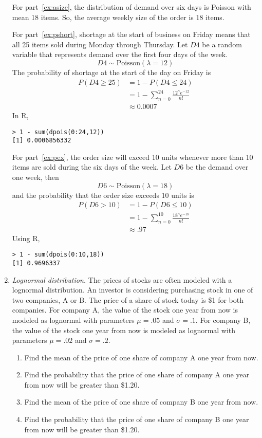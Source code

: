 \begin{enumerate}
\begin{solution}
\bs
For part~\ref{ex:asize}, the distribution of demand over six days is
Poisson with mean 18 items. So, the average weekly size
of the order is 18 items.

For part~\ref{ex:pshort}, shortage at the start of business on Friday means
that all 25 items sold during Monday through Thursday. Let
$D4$ be a random variable that represents demand over the
first four days of the week.
\[ D4 \sim \text{Poisson}(\lambda = 12) \]
The probability of shortage at the start of the day on Friday is
\begin{align*}
  P(D4 \geq 25) &= 1 - P(D4 \leq 24)\\
                &= 1 - \sum_{n=0}^{24} \frac{12^n e^{-12}}{n!}\\
                &\approx 0.0007
\end{align*}
In R,
\begin{Verbatim}
> 1 - sum(dpois(0:24,12))
[1] 0.0006856332
\end{Verbatim}

For part~\ref{ex:pex}, the order size will exceed 10 units whenever more than
10 items are sold during the six days of the week. Let $D6$ be
the demand over one week, then
\[ D6 \sim \text{Poisson}(\lambda = 18) \]
and the probability that the order size exceeds 10 units is
\begin{align*}
  P(D6 > 10) &= 1 - P(D6 \leq 10) \\
             &= 1 - \sum_{n=0}^{10} \frac{18^n e^{-18}}{n!}\\
             &\approx .97
\end{align*}
Using R,
\begin{Verbatim}
> 1 - sum(dpois(0:10,18))
[1] 0.9696337
\end{Verbatim}
\end{solution}

\item \emph{Lognormal distribution.} The prices of stocks are often modeled
  with a lognormal distribution. An investor is considering purchasing
  stock in one of two companies, A or B. The price of a share of stock
  today is \$1 for both companies. For company A, the value of the
  stock one year from now is modeled as lognormal with parameters
  $\mu=.05$ and $\sigma=.1$. For company B, the value of the stock one
  year from now is modeled as lognormal with parameters $\mu=.02$ and
  $\sigma=.2$.
\begin{enumerate}
\item Find the mean of the price of one share of company A one year
  from now. \label{a1}
\item Find the probability that the price of one share of company A
  one year from now will be greater than \$1.20. \label{a2}
\item Find the mean of the price of one share of company B one year
  from now. \label{b1}
\item Find the probability that the price of one share of company B
  one year from now will be greater than \$1.20. \label{b2}
\end{enumerate}


\end{enumerate}
